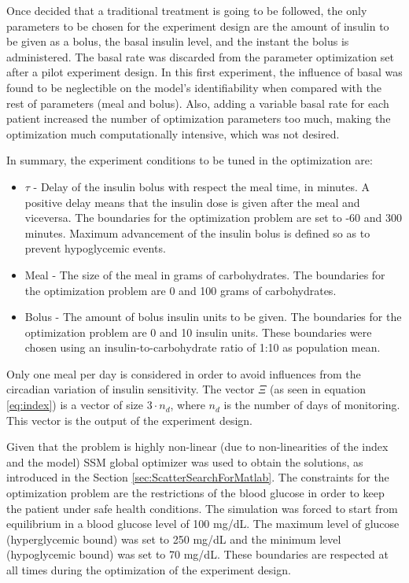 Once decided that a traditional treatment is going to be followed, the only parameters to be chosen for the experiment design are the amount of insulin to be given as a bolus, the basal insulin level, and the instant the bolus is administered. The basal rate was discarded from the parameter optimization set after a pilot experiment design. In this first experiment, the influence of basal was found to be neglectible on the model's identifiability when compared with the rest of parameters (meal and bolus). Also, adding a variable basal rate for each patient increased the number of optimization parameters too much, making the optimization much computationally intensive, which was not desired.

In summary, the experiment conditions to be tuned in the optimization are:
\begin{itemize}
\item $\tau$ - Delay of the insulin bolus with respect the meal time, in minutes. A positive delay means that the insulin dose is given after the meal and viceversa. The boundaries for the optimization problem are set to -60 and 300 minutes. Maximum advancement of the insulin bolus is defined so as to prevent hypoglycemic events.
\item Meal - The size of the meal in grams of carbohydrates. The boundaries for the optimization problem are 0 and 100 grams of carbohydrates.
\item Bolus - The amount of bolus insulin units to be given. The boundaries for the optimization problem are 0 and 10 insulin units. These boundaries were chosen using an insulin-to-carbohydrate ratio of 1:10 as population mean.
\end{itemize}
Only one meal per day is considered in order to avoid influences from the circadian variation of insulin sensitivity. The vector $\Xi$ (as seen in equation \eqref{eq:index}) is a vector of size $3\cdot n_d$, where $n_d$ is the number of days of monitoring. This vector is the output of the experiment design.

Given that the problem is highly non-linear (due to non-linearities of the index and the model) SSM global optimizer was used to obtain the solutions, as introduced in the Section \ref{sec:ScatterSearchForMatlab}. The constraints for the optimization problem are the restrictions of the blood glucose in order to keep the patient under safe health conditions. The simulation was forced to start from equilibrium in a blood glucose level of 100 mg/dL. The maximum level of glucose (hyperglycemic bound) was set to 250 mg/dL and the minimum level (hypoglycemic bound) was set to 70 mg/dL. These boundaries are respected at all times during the optimization of the experiment design.

